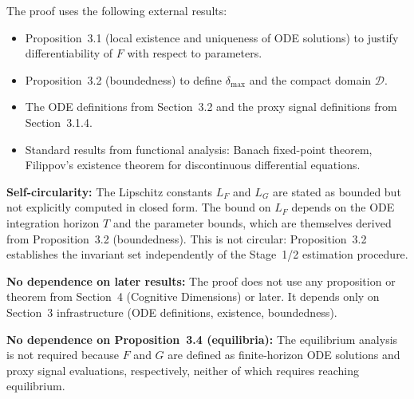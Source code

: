 \begin{circularity-check}
The proof uses the following external results:
\begin{itemize}[nosep]
\item Proposition~3.1 (local existence and uniqueness of ODE solutions)
  to justify differentiability of $F$ with respect to parameters.
\item Proposition~3.2 (boundedness) to define $\delta_{\max}$ and the
  compact domain $\mathcal{D}$.
\item The ODE definitions from Section~3.2 and the proxy signal
  definitions from Section~3.1.4.
\item Standard results from functional analysis: Banach fixed-point
  theorem, Filippov's existence theorem for discontinuous differential
  equations.
\end{itemize}

\textbf{Self-circularity:} The Lipschitz constants $L_F$ and $L_G$
are stated as bounded but not explicitly computed in closed form.
The bound on $L_F$ depends on the ODE integration horizon $T$ and
the parameter bounds, which are themselves derived from
Proposition~3.2 (boundedness). This is not circular: Proposition~3.2
establishes the invariant set independently of the Stage~1/2
estimation procedure.

\textbf{No dependence on later results:} The proof does not use any
proposition or theorem from Section~4 (Cognitive Dimensions) or
later. It depends only on Section~3 infrastructure (ODE definitions,
existence, boundedness).

\textbf{No dependence on Proposition~3.4 (equilibria):} The equilibrium
analysis is not required because $F$ and $G$ are defined as
finite-horizon ODE solutions and proxy signal evaluations,
respectively, neither of which requires reaching equilibrium.
\end{circularity-check}
